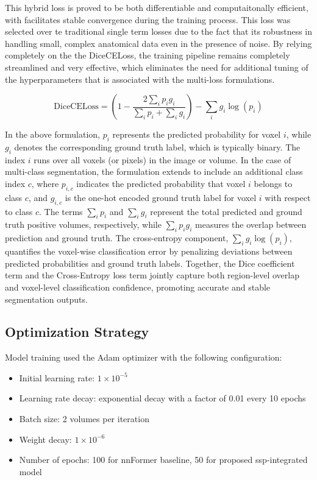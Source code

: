 This hybrid loss is proved to be both differentiable and computaitonally efficient, with facilitates stable convergence during the training process. This loss was selected over te traditional single term losses due to the fact that its robustness in handling small, complex anatomical data even in the presence of noise. By relying completely on the the DiceCELoss, the training pipeline remains completely streamlined and very effective, which eliminates the need for additional tuning of the hyperparameters that is associated with the multi-loss formulations.

\begin{equation}
\text{DiceCELoss} = \left( 1 - \frac{2 \sum_{i} p_i g_i}{\sum_{i} p_i + \sum_{i} g_i} \right) - \sum_{i} g_i \log(p_i)
\end{equation}

In the above formulation, \( p_i \) represents the predicted probability for voxel \( i \), while \( g_i \) denotes the corresponding ground truth label, which is typically binary. The index \( i \) runs over all voxels (or pixels) in the image or volume. In the case of multi-class segmentation, the formulation extends to include an additional class index \( c \), where \( p_{i,c} \) indicates the predicted probability that voxel \( i \) belongs to class \( c \), and \( g_{i,c} \) is the one-hot encoded ground truth label for voxel \( i \) with respect to class \( c \). The terms \( \sum_i p_i \) and \( \sum_i g_i \) represent the total predicted and ground truth positive volumes, respectively, while \( \sum_i p_i g_i \) measures the overlap between prediction and ground truth. The cross-entropy component, \( \sum_i g_i \log(p_i) \), quantifies the voxel-wise classification error by penalizing deviations between predicted probabilities and ground truth labels. Together, the Dice coefficient term and the Cross-Entropy loss term jointly capture both region-level overlap and voxel-level classification confidence, promoting accurate and stable segmentation outputs.

\subsection{Optimization Strategy}
Model training used the Adam optimizer \cite{Kingma2015Adam} with the following configuration:

\begin{itemize} \item Initial learning rate: $1 \times 10^{-5}$ \item Learning rate decay: exponential decay with a factor of 0.01 every 10 epochs \item Batch size: 2 volumes per iteration \item Weight decay: $1 \times 10^{-6}$ \item Number of epochs: 100 for nnFormer baseline, 50 for proposed \gls{ssp}-integrated model \end{itemize}

